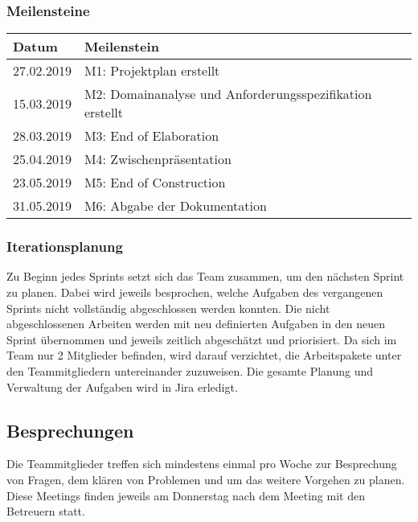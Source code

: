 \subsubsection{Meilensteine}
\begin{center}
	\begin{tabular}{| m{3cm} | m{9cm}|}
	\hline
	\textbf{Datum} & \textbf{Meilenstein} \\
	\hline
	27.02.2019 & M1: Projektplan erstellt \\
	\hline
	15.03.2019 & M2: Domainanalyse und Anforderungsspezifikation erstellt \\
	\hline
	28.03.2019 & M3: End of Elaboration \\
	\hline
	25.04.2019 & M4: Zwischenpräsentation \\
	\hline
	23.05.2019 & M5: End of Construction \\
	\hline
	31.05.2019 & M6: Abgabe der Dokumentation \\
	\hline
	\end{tabular}
\end{center}

\subsubsection{Iterationsplanung}
Zu Beginn jedes Sprints setzt sich das Team zusammen, um den nächsten Sprint zu planen. Dabei wird jeweils besprochen, welche Aufgaben des vergangenen Sprints nicht vollständig abgeschlossen werden konnten. Die nicht abgeschlossenen Arbeiten werden mit neu definierten Aufgaben in den neuen Sprint übernommen und jeweils zeitlich abgeschätzt und priorisiert. Da sich im Team nur 2 Mitglieder befinden, wird darauf verzichtet, die Arbeitspakete unter den Teammitgliedern untereinander zuzuweisen. Die gesamte Planung und Verwaltung der Aufgaben wird in Jira erledigt.

\subsection{Besprechungen}
Die Teammitglieder treffen sich mindestens einmal pro Woche zur Besprechung von Fragen, dem klären von Problemen und um das weitere Vorgehen zu planen. \newline
Diese Meetings finden jeweils am Donnerstag nach dem Meeting mit den Betreuern statt.


\newpage
